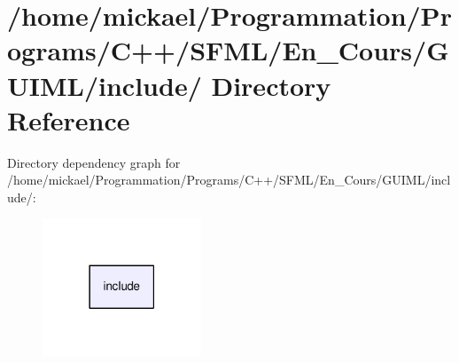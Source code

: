 \section{/home/mickael/\-Programmation/\-Programs/\-C++/\-S\-F\-M\-L/\-En\-\_\-\-Cours/\-G\-U\-I\-M\-L/include/ Directory Reference}
\label{dir_4fcde4abe03ce5772a7ca44648edb579}
Directory dependency graph for /home/mickael/\-Programmation/\-Programs/\-C++/\-S\-F\-M\-L/\-En\-\_\-\-Cours/\-G\-U\-I\-M\-L/include/\-:\nopagebreak
\begin{figure}[H]
\begin{center}
\leavevmode
\includegraphics[width=134pt]{dir_4fcde4abe03ce5772a7ca44648edb579_dep}
\end{center}
\end{figure}
